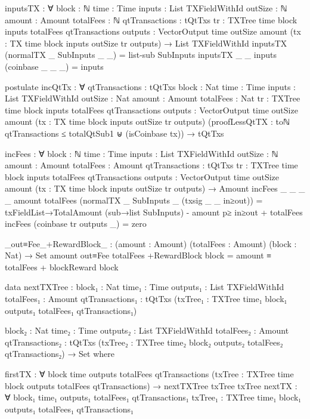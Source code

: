 \documentclass{beamer}
\begin{document}
\begin{code}
      inputsTX : ∀ {block : ℕ} {time : Time}
        {inputs : List TXFieldWithId}
        {outSize : ℕ} {amount : Amount}
        {totalFees : ℕ} {qtTransactions : tQtTxs}
        {tr : TXTree time block inputs totalFees qtTransactions}
        {outputs : VectorOutput time outSize amount}
        (tx : TX {time} {block} {inputs} {outSize} tr outputs)
        → List TXFieldWithId
      inputsTX (normalTX _ SubInputs _ _) = list-sub SubInputs
      inputsTX {_} {_} {inputs} (coinbase _ _ _) = inputs

      postulate
        incQtTx : ∀ {qtTransactions : tQtTxs}
          {block : Nat} {time : Time}
          {inputs : List TXFieldWithId}
          {outSize : Nat} {amount : Amount}
          {totalFees : Nat}
          {tr : TXTree time block inputs totalFees qtTransactions}
          {outputs : VectorOutput time outSize amount}
          (tx : TX {time} {block} {inputs} {outSize} tr outputs)
          (proofLessQtTX :
              toℕ qtTransactions ≤ totalQtSub1
              ⊎
              (isCoinbase tx))
          → tQtTxs

      incFees : ∀ {block : ℕ} {time : Time}
        {inputs : List TXFieldWithId}
        {outSize : ℕ} {amount : Amount}
        {totalFees : Amount} {qtTransactions : tQtTxs}
        {tr : TXTree time block inputs totalFees qtTransactions}
        {outputs : VectorOutput time outSize amount}
        (tx : TX {time} {block} {inputs} {outSize} tr outputs)
        → Amount
      incFees {_} {_} {_} {_} {amount} {totalFees}
        (normalTX _ SubInputs _ (txsig _ _ in≥out)) =
        txFieldList→TotalAmount (sub→list SubInputs)
        - amount p≥ in≥out
        + totalFees
      incFees (coinbase tr outputs _) = zero

      _out≡Fee_+RewardBlock_ : (amount : Amount)
        (totalFees : Amount)
        (block : Nat) → Set
      amount out≡Fee totalFees +RewardBlock block =
        amount ≡ totalFees + blockReward block


    data nextTXTree :
      {block₁ : Nat}
      {time₁ : Time}
      {outputs₁ : List TXFieldWithId}
      {totalFees₁ : Amount}
      {qtTransactions₁ : tQtTxs}
      (txTree₁ : TXTree time₁ block₁ outputs₁ totalFees₁ qtTransactions₁)

      {block₂ : Nat}
      {time₂ : Time}
      {outputs₂ : List TXFieldWithId}
      {totalFees₂ : Amount}
      {qtTransactions₂ : tQtTxs}
      (txTree₂ : TXTree time₂ block₂ outputs₂ totalFees₂ qtTransactions₂)
      → Set where

      firstTX : ∀ {block time outputs totalFees qtTransactions}
        (txTree : TXTree time block outputs totalFees qtTransactions)
        → nextTXTree txTree txTree
      nextTX : ∀ {block₁ time₁ outputs₁ totalFees₁ qtTransactions₁}
        {txTree₁ : TXTree time₁ block₁ outputs₁ totalFees₁ qtTransactions₁}


\end{code}
\end{document}
